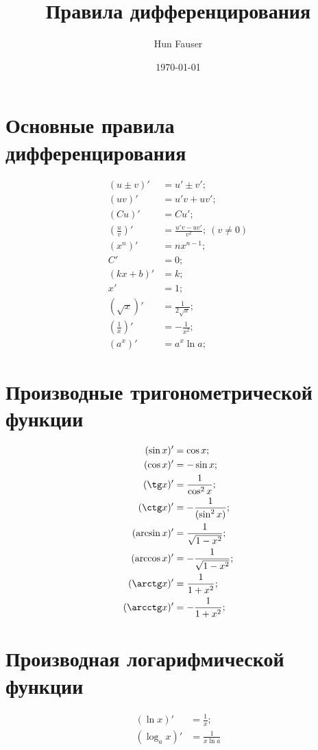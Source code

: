 \documentclass[a4paper,12pt]{article}
\author{Hun Fauser}
\title{Правила дифференцирования}
\date{\today}
\begin{document}

\maketitle

\section{Основные правила дифференцирования}

\begin{align*}
(u \pm v)' &= u' \pm v'; \\
(uv)' &= u'v + uv'; \\
(Cu)' &= Cu'; \\
\left( \frac{u}{v} \right)' &= \frac{u'v - uv'}{v^2}; ~(v \ne 0) \\
(x^n)' &= nx^{n - 1}; \\
C' &= 0; \\
(kx + b)' &= k; \\
x' &= 1; \\
(\sqrt{x})' &= \frac{1}{2\sqrt{x}}; \\
\left( \frac{1}{x} \right)' &= -\frac{1}{x^2}; \\
(a^x)' &= a^x \ln a;
\end{align*}

\section{Производные тригонометрической функции}

\begin{align*}
(\sin x)' &= \cos x; \\
(\cos x)' &= -\sin x; \\
(\tg x)' &= \frac{1}{\cos^2 x}; \\
(\ctg x)' &= -\frac{1}{(\sin^2 x)}; \\
(\arcsin x)' &= \frac{1}{\sqrt{1 - x^2}}; \\
(\arccos x)' &= -\frac{1}{\sqrt{1 - x^2}}; \\
(\arctg x)' &= \frac{1}{1 + x^2}; \\
(\arcctg x)' &= -\frac{1}{1 + x^2}; \\
\end{align*}

\section{Производная логарифмической функции}

\begin{align*}
(\ln x)' &= \frac{1}{x}; \\
(\log_{a} x)' &= \frac{1}{x\ln a}
\end{align*}
\end{document}
